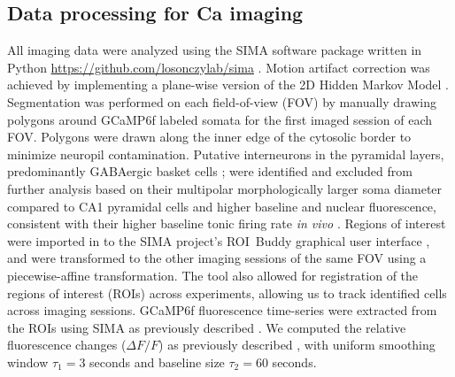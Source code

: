 \subsection{Data processing for Ca imaging}\label{sec:df:methods:processing}
All imaging data were analyzed using the SIMA software package written in Python \url{https://github.com/losonczylab/sima} \citep{Kaifosh2014}. Motion artifact correction was achieved by implementing a plane-wise version of the 2D Hidden Markov Model \citep{Dombeck2010, Kaifosh2013, Kaifosh2014}. Segmentation was performed on each field-of-view (FOV) by manually drawing polygons around GCaMP6f labeled somata for the first imaged session of each FOV. Polygons were drawn along the inner edge of the cytosolic border to minimize neuropil contamination. Putative interneurons in the pyramidal layers, predominantly GABAergic basket cells \citep{Bezaire2013, Freund1996, Klausberger2008}; were identified and excluded from further analysis based on their multipolar morphologically larger soma diameter compared to CA1 pyramidal cells \citep{Ambros-Ingerson2005, Gulyas1999a, Papp2013} and higher baseline and nuclear fluorescence, consistent with their higher baseline tonic firing rate \emph{in vivo} \citep{Klausberger2003, Klausberger2008, Lapray2012, Varga2012}. Regions of interest were imported in to the SIMA project's ROI~Buddy graphical user interface \citep{Kaifosh2014}, and were transformed to the other imaging sessions of the same FOV using a piecewise-affine transformation. The tool also allowed for registration of the regions of interest (ROIs) across experiments, allowing us to track identified cells across imaging sessions. GCaMP6f fluorescence time-series were extracted from the ROIs using SIMA as previously described \citep{Kaifosh2014}. We computed the relative fluorescence changes ($\Delta F/F$) as previously described \citep{Jia2011}, with uniform smoothing window $\tau_1 = 3$ seconds and baseline size $\tau_2 = 60$ seconds.

